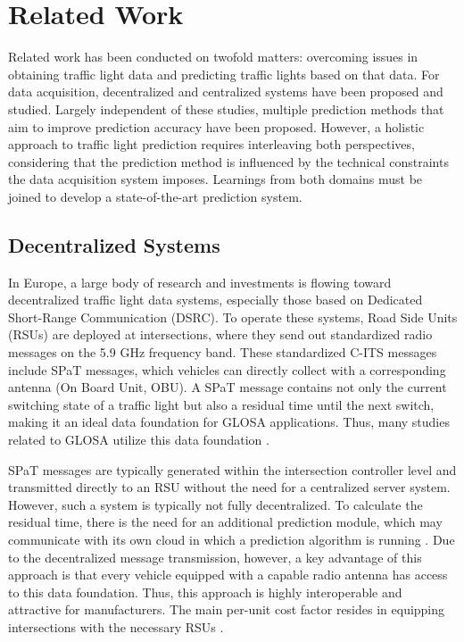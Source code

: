 \section{Related Work}

Related work has been conducted on twofold matters: overcoming issues in obtaining traffic light data and predicting traffic lights based on that data. For data acquisition, decentralized and centralized systems have been proposed and studied. Largely independent of these studies, multiple prediction methods that aim to improve prediction accuracy have been proposed. However, a holistic approach to traffic light prediction requires interleaving both perspectives, considering that the prediction method is influenced by the technical constraints the data acquisition system imposes. Learnings from both domains must be joined to develop a state-of-the-art prediction system.

\subsection{Decentralized Systems}

In Europe, a large body of research and investments is flowing toward decentralized traffic light data systems, especially those based on Dedicated Short-Range Communication (DSRC). To operate these systems, Road Side Units (RSUs) are deployed at intersections, where they send out standardized radio messages on the 5.9 GHz frequency band. These standardized C-ITS messages include SPaT messages, which vehicles can directly collect with a corresponding antenna (On Board Unit, OBU). A SPaT message contains not only the current switching state of a traffic light but also a residual time until the next switch, making it an ideal data foundation for GLOSA applications. Thus, many studies related to GLOSA utilize this data foundation \cite{schweiger_elisatm_2011, rakha_eco-driving_2011, rakha_aeris_2012, li_open_2012, suramardhana_driver-centric_2014, xu_bb_2015, bernais_design_2016, nguyen_efficient_2016, choudhury_integrated_2016, stahlmann_multi-hop_2017, stahlmann_exploring_2018, plianos_predictive_2018, zhang_green_2020, chen_developing_2022}.

SPaT messages are typically generated within the intersection controller level \cite{zweck_traffic_2013} and transmitted directly to an RSU without the need for a centralized server system. However, such a system is typically not fully decentralized. To calculate the residual time, there is the need for an additional prediction module, which may communicate with its own cloud in which a prediction algorithm is running \cite{strobl_c-its_2019, neuner_leitfaden_2020}. Due to the decentralized message transmission, however, a key advantage of this approach is that every vehicle equipped with a capable radio antenna has access to this data foundation. Thus, this approach is highly interoperable and attractive for manufacturers. The main per-unit cost factor resides in equipping intersections with the necessary RSUs \cite{niebel_cost-benefit-based_2013}.

